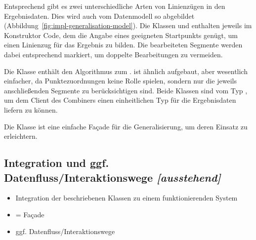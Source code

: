 \documentclass[../main/thesis.tex]{subfiles}
\begin{document}

Entsprechend gibt es zwei unterschiedliche Arten von Linienzügen in den Ergebnisdaten.
Dies wird auch vom Datenmodell so abgebildet (Abbildung~\ref{fig:impl-generalisation-model}).
Die Klassen  und  enthalten jeweils im Konstruktor Code, dem die Angabe eines geeigneten Startpunkts genügt, um einen Linienzug für das Ergebnis zu bilden.
Die bearbeiteten Segmente werden dabei entsprechend markiert, um doppelte Bearbeitungen zu vermeiden.

Die Klasse  enthält den Algorithmus zum .
 ist ähnlich aufgebaut, aber wesentlich einfacher, da Punktezuordnungen keine Rolle spielen, sondern nur die jeweils anschließenden Segmente zu berücksichtigen sind.
Beide Klassen sind vom Typ , um dem Client des Combiners einen einheitlichen Typ für die Ergebnisdaten liefern zu können.

Die Klasse  ist eine einfache Façade für die Generalisierung, um deren Einsatz zu erleichtern.



\subsection{Integration und ggf. Datenfluss/Interaktionswege \emph{[ausstehend]}}

\begin{itemize}
\item Integration der beschriebenen Klassen zu einem funktionierenden System
\item {} = Façade
\item ggf. Datenfluss/Interaktionswege
\end{itemize}
\end{document}
